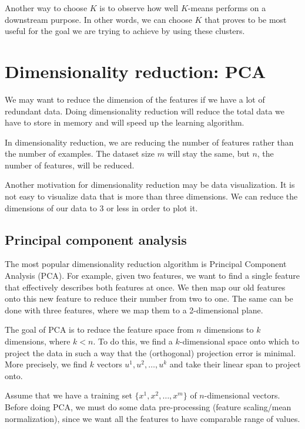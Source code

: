 \documentclass[a4paper,11pt]{report}
\begin{document}
Another way to choose $K$ is to observe how well $K$-means performs on a downstream purpose. In other words, we can choose $K$ that proves to be most useful for the goal we are trying to achieve by using these clusters.


\section{Dimensionality reduction: PCA}

We may want to reduce the dimension of the features if we have a lot of redundant data. Doing dimensionality reduction will reduce the total data we have to store in memory and will speed up the learning algorithm.

In dimensionality reduction, we are reducing the number of features rather than the number of examples. The dataset size $m$ will stay the same, but $n$, the number of features, will be reduced.

Another motivation for dimensionality reduction may be data visualization. It is not easy to visualize data that is more than three dimensions. We can reduce the dimensions of our data to 3 or less in order to plot it.

\subsection*{Principal component analysis}

The most popular dimensionality reduction algorithm is Principal Component Analysis (PCA). For example, given two features, we want to find a single feature that effectively describes both features at once. We then map our old features onto this new feature to reduce their number from two to one. The same can be done with three features, where we map them to a 2-dimensional plane.

The goal of PCA is to reduce the feature space from $n$ dimensions to $k$ dimensions, where $k < n$. To do this, we find a $k$-dimensional space onto which to project the data in such a way that the (orthogonal) projection error is minimal. More precisely, we find $k$ vectors $u^1, u^2, \ldots, u^k$ and take their linear span to project onto.

Assume that we have a training set $\{x^1, x^2, \ldots, x^m\}$ of $n$-dimensional vectors. Before doing PCA, we must do some data pre-processing (feature scaling/mean normalization), since we want all the features to have comparable range of values.
\end{document}
